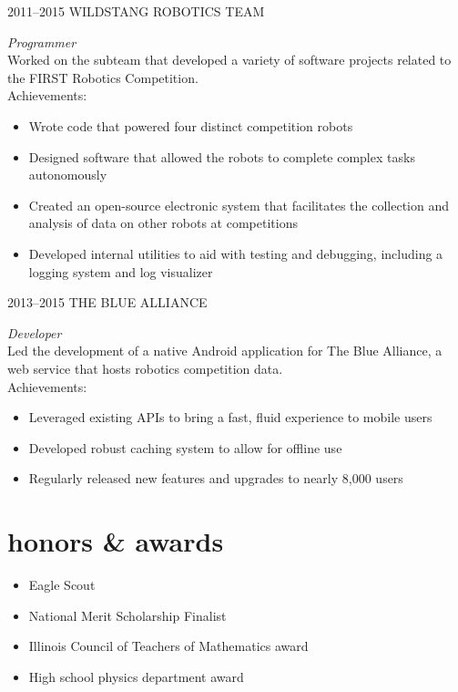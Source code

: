 \documentclass[]{resume} %
\begin{document}
\begin{entrylist}


\entry
{2011--2015}
{WILDSTANG ROBOTICS TEAM}
{}
{\emph{Programmer} \\
Worked on the subteam that developed a variety of software projects related to the FIRST Robotics Competition. \\
Achievements:
\begin{itemize}
\item Wrote code that powered four distinct competition robots
\item Designed software that allowed the robots to complete complex tasks autonomously
\item Created an open-source electronic system that facilitates the collection and analysis of data on other robots at competitions
\item Developed internal utilities to aid with testing and debugging, including a logging system and log visualizer
\end{itemize}}


\entry
{2013--2015}
{THE BLUE ALLIANCE}
{}
{\emph{Developer} \\
Led the development of a native Android application for The Blue Alliance, a web service that hosts robotics competition data. \\
Achievements:
\begin{itemize}
\item Leveraged existing APIs to bring a fast, fluid experience to mobile users
\item Developed robust caching system to allow for offline use
\item Regularly released new features and upgrades to nearly 8,000 users
\end{itemize}}

\end{entrylist}



\section{honors \& awards}

\begin{itemize}
\item Eagle Scout
\item National Merit Scholarship Finalist
\item Illinois Council of Teachers of Mathematics award
\item High school physics department award
\end{itemize}
\end{document}
